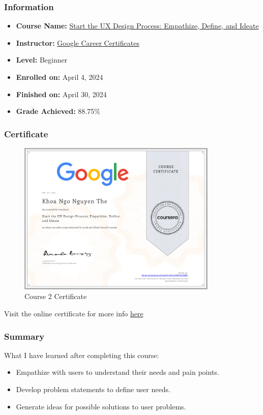 \subsubsection{Information}
\begin{itemize}
	\item \textbf{Course Name:} \href{https://www.coursera.org/learn/start-ux-design-process}{Start the UX Design Process: Empathize, Define, and Ideate}
	\item \textbf{Instructor:} \href{https://www.coursera.org/instructor/google-career-certificates}{Google Career Certificates}
	\item \textbf{Level:} Beginner
	\item \textbf{Enrolled on:} April 4, 2024
	\item \textbf{Finished on:} April 30, 2024
	\item \textbf{Grade Achieved:} 88.75\%
\end{itemize}

\subsubsection{Certificate}
\begin{flushleft}
	\begin{figure}[!ht]
		\centering
		\includegraphics[width=0.85\textwidth]{imgs/Course2.png}
		\caption{Course 2 Certificate}
	\end{figure}

	Visit the online certificate for more info \href{https://www.coursera.org/account/accomplishments/verify/DDC4TWUFU6MM}{here}
\end{flushleft}

\subsubsection{Summary}
\begin{flushleft}
	What I have learned after completing this course:
	\begin{itemize}
		\item Empathize with users to understand their needs and pain points.
		\item Develop problem statements to define user needs.
		\item Generate ideas for possible solutions to user problems.
	\end{itemize}
\end{flushleft}

